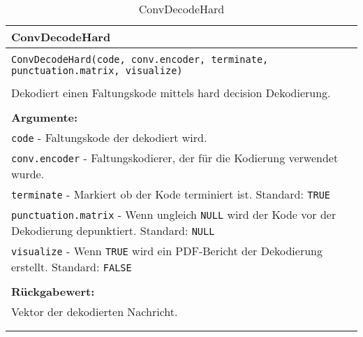\begin{longtable}{|p{\textwidth}|}
\hline
\rowcolor{lightblue}
ConvDecodeHard
\\
\hline
\\
\texttt{ConvDecodeHard(code, conv.encoder, terminate, punctuation.matrix, visualize)}\\
\\
Dekodiert einen Faltungskode mittels hard decision Dekodierung.\\
\\
\textbf{Argumente:}\\
\texttt{code} - Faltungskode der dekodiert wird.\\
\texttt{conv.encoder} - Faltungskodierer, der für die Kodierung verwendet wurde.\\
\texttt{terminate} - Markiert ob der Kode terminiert ist. Standard: \texttt{TRUE}\\
\texttt{punctuation.matrix} - Wenn ungleich \texttt{NULL} wird der Kode vor der Dekodierung depunktiert. Standard: \texttt{NULL}\\
\texttt{visualize} - Wenn \texttt{TRUE} wird ein PDF-Bericht der Dekodierung erstellt. Standard: \texttt{FALSE}\\
\\
\textbf{Rückgabewert:}\\
Vektor der dekodierten Nachricht.\\
\\
\hline
\caption{ConvDecodeHard}
\label{funktion:ConvDecodeHard}
\end{longtable}